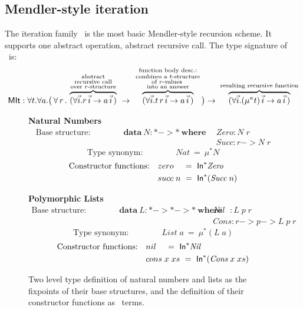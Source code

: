 \subsection{Mendler-style iteration}\label{sec:mendler:it}
The iteration family \MIt\ is the most basic Mendler-style recursion scheme.
It supports one abstract operation, abstract recursive call.
The type signature of \MIt\ is:
\[ \textsf{MIt} : \forall t . \forall a .
   \big(\, \forall\, r\, . \;
         \overset{\begin{smallmatrix}
                        \text{abstract} \\
                        \text{recursive call} \\
                        \text{over $r$-structure}
                       \end{smallmatrix}}{\overbrace{
            (\forall\vec{i} . r\,\vec{i} -> a\,\vec{i}\,) }} \;
   -> \; \overset{\begin{smallmatrix}
                        \text{function body desc.:} \\
                        \text{combines a $t$-structure} \\
                        \text{of $r$-values } \\
                        \text{into an answer}
                       \end{smallmatrix}}{\overbrace{
            (\forall\vec{i} . t\, r\,\vec{i} -> a\,\vec{i}\,) }}
   \big)
 -> \; \overset{\text{resulting recursive function}}{\overbrace{
          (\forall\vec{i} . (\mu^\kappa t)\,\vec{i} -> a\,\vec{i}\,) }} 
\]
\begin{figure}
{\bf Natural Numbers}
\begin{align*}
\text{Base structure:}\qquad\qquad
\textbf{data}~N : * -> * ~\textbf{where}~~
& \textit{Zero} : N\;r\\
& \textit{Succ} : r -> N\;r
\end{align*}
\[\text{Type synonym:}\qquad\qquad \textit{Nat} ~=~ \mu^{*} N\]
\begin{align*}
\text{Constructor functions:}\quad
&zero~~\,~=~ \textsf{In}^{*} \textit{Zero} \\
&succ\;n ~=~ \textsf{In}^{*} (\textit{Succ}\;n)
\end{align*}

{\bf Polymorphic Lists}
\begin{align*}
\text{Base structure:}\qquad\qquad
\textbf{data}~L : * -> * -> * ~\textbf{where}~~
& \textit{Nil}~~\, : L\;p\;r \\
& \textit{Cons}    : r -> p -> L\;p\;r
\end{align*}
\[\text{Type synonym:}\qquad\qquad \textit{List} \; a  ~=~ \mu^{*} (L\;a)\]
\begin{align*}
\text{Constructor functions:}\quad
&nil~~\,~=~ \textsf{In}^{*} \textit{Nil} \\
&cons\;x\;xs ~=~ \textsf{In}^{*} (\textit{Cons}\;x\;xs)
\end{align*}

\caption{Two level type definition of natural numbers and lists
         as the fixpoints of their base structures, and
         the definition of their constructor functions as \In\ terms.}
\label{fig:natdef}
\end{figure}
